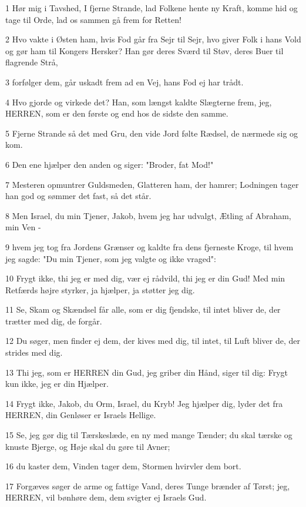 \par 1 Hør mig i Tavshed, I fjerne Strande, lad Folkene hente ny Kraft, komme hid og tage til Orde, lad os sammen gå frem for Retten!
\par 2 Hvo vakte i Østen ham, hvis Fod går fra Sejr til Sejr, hvo giver Folk i hans Vold og gør ham til Kongers Hersker? Han gør deres Sværd til Støv, deres Buer til flagrende Strå,
\par 3 forfølger dem, går uskadt frem ad en Vej, hans Fod ej har trådt.
\par 4 Hvo gjorde og virkede det? Han, som længst kaldte Slægterne frem, jeg, HERREN, som er den første og end hos de sidste den samme.
\par 5 Fjerne Strande så det med Gru, den vide Jord følte Rædsel, de nærmede sig og kom.
\par 6 Den ene hjælper den anden og siger: "Broder, fat Mod!"
\par 7 Mesteren opmuntrer Guldsmeden, Glatteren ham, der hamrer; Lodningen tager han god og sømmer det fast, så det står.
\par 8 Men Israel, du min Tjener, Jakob, hvem jeg har udvalgt, Ætling af Abraham, min Ven -
\par 9 hvem jeg tog fra Jordens Grænser og kaldte fra dens fjerneste Kroge, til hvem jeg sagde: "Du min Tjener, som jeg valgte og ikke vraged":
\par 10 Frygt ikke, thi jeg er med dig, vær ej rådvild, thi jeg er din Gud! Med min Retfærds højre styrker, ja hjælper, ja støtter jeg dig.
\par 11 Se, Skam og Skændsel får alle, som er dig fjendske, til intet bliver de, der trætter med dig, de forgår.
\par 12 Du søger, men finder ej dem, der kives med dig, til intet, til Luft bliver de, der strides med dig.
\par 13 Thi jeg, som er HERREN din Gud, jeg griber din Hånd, siger til dig: Frygt kun ikke, jeg er din Hjælper.
\par 14 Frygt ikke, Jakob, du Orm, Israel, du Kryb! Jeg hjælper dig, lyder det fra HERREN, din Genløser er Israels Hellige.
\par 15 Se, jeg gør dig til Tærskeslæde, en ny med mange Tænder; du skal tærske og knuste Bjerge, og Høje skal du gøre til Avner;
\par 16 du kaster dem, Vinden tager dem, Stormen hvirvler dem bort.
\par 17 Forgæves søger de arme og fattige Vand, deres Tunge brænder af Tørst; jeg, HERREN, vil bønhøre dem, dem svigter ej Israels Gud.
